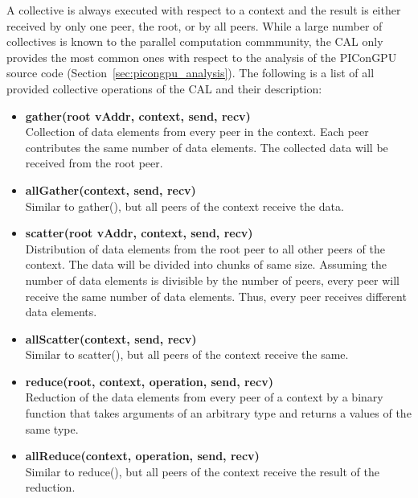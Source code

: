 A collective is always executed with respect to a context and the
result is either received by only one peer, the root, or by all peers.
While a large number of collectives is known to the parallel
computation commmunity, the CAL only provides the most common ones
with respect to the analysis of the PIConGPU source code
(Section~\ref{sec:picongpu_analysis}).   The following is
a list of all provided collective operations of the CAL and their
description:


\begin{itemize}
\item  \textbf{gather(root vAddr, context, send, recv)}\\
  Collection of data elements from every peer in the context. Each peer
  contributes the same number of data elements. The collected data will
  be received from the root peer.

\item \textbf{allGather(context, send, recv)}\\
  Similar to gather(), but all peers of the context receive the data.

\item  \textbf{scatter(root vAddr, context, send, recv)}\\
  Distribution of data elements from the root peer to all other peers of
  the context. The data will be divided into chunks of same
  size. Assuming the number of data elements is divisible by the number
  of peers, every peer will receive the same number of data
  elements. Thus, every peer receives different data elements.

\item  \textbf{allScatter(context, send, recv)}\\
  Similar to scatter(), but all peers of the context receive the same.

\item  \textbf{reduce(root, context, operation, send, recv)}\\
  Reduction of the data elements from every peer of a context
  by a binary function that takes arguments of an arbitrary type
  and returns a values of the same type.

\item  \textbf{allReduce(context, operation, send, recv)}\\
  Similar to reduce(), but all peers of the context receive the
  result of the reduction.


\end{itemize}
